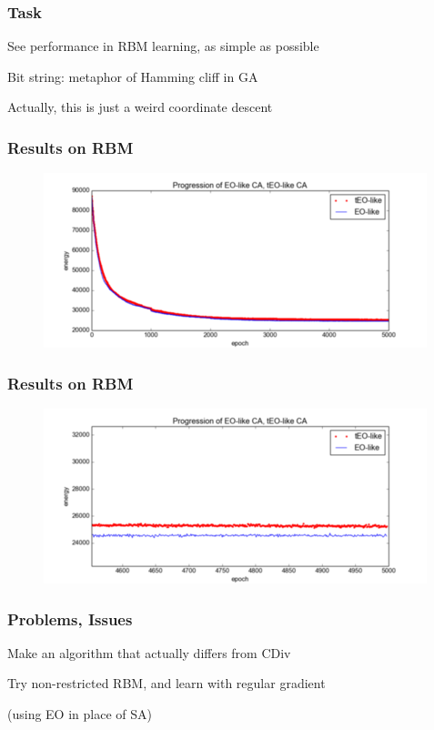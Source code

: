 \documentclass{beamer}
\begin{document}
\begin{frame}
  \frametitle{Task}
  See performance in RBM learning, as simple as possible

  Bit string: metaphor of Hamming cliff in GA

  Actually, this is just a weird coordinate descent
\end{frame}

\begin{frame}
  \frametitle{Results on RBM}
  \begin{figure}
    \includegraphics{eo_rbm_unzoomed}
  \end{figure}
\end{frame}

\begin{frame}
  \frametitle{Results on RBM}
  \begin{figure}
    \includegraphics{eo_rbm_zoomed}
  \end{figure}
\end{frame}

\begin{frame}
  \frametitle{Problems, Issues}
  Make an algorithm that actually differs from CDiv

  Try non-restricted RBM, and learn with regular gradient

  (using EO in place of SA)
\end{frame}
\end{document}
